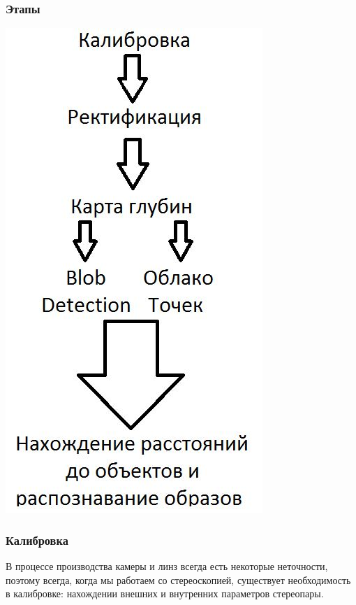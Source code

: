\documentclass{beamer}
\begin{document}
		\begin{frame}
		    \frametitle{Этапы}

		    \begin{center}
				\includegraphics[scale=0.62]{images/stereoVisionPipeline}
			\end{center}
		\end{frame}
		
		\begin{frame}
			\frametitle{Калибровка}
			
			В процессе производства камеры и линз всегда есть некоторые неточности,
			поэтому всегда, когда мы работаем со стереоскопией, существует необходимость
			в калибровке: нахождении внешних и внутренних параметров стереопары.
		\end{frame}
\end{document}
